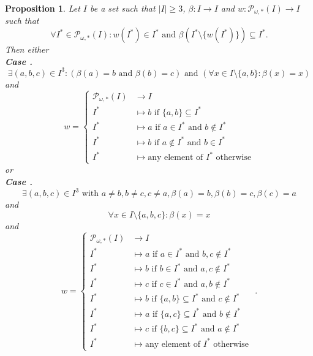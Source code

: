 \documentclass[a4paper,11pt]{article}
\newcommand*\circled[1]{\tikz[baseline=(char.base)]{
            \node[shape=circle,draw,inner sep=2pt] (char) {#1};}}
\theoremstyle{plain}
\newtheorem{proposition}{Proposition}[section]
\theoremstyle{definition}
\theoremstyle{remark}
\begin{document}
\begin{proposition}
\label{propBetaAllP*I}
Let $I$ be a set such that $|I| \geq 3$, $\beta : I \to I$ and $w : \mathcal{P}_{\omega,*}(I) \to I$ such that 
\[ \forall I^* \in \mathcal{P}_{\omega,*}(I) : w(I^*) \in I^* \text{ and } \beta(I^* \setminus \{w(I^*)\}) \subseteq I^*. \] 
Then either \\
\textbf{Case \circled{1}.}
\[ \exists (a,b,c) \in I^3 : (\beta(a)=b \text{ and } \beta(b)=c) \text{ and } (\forall x \in I \setminus \{a,b\} : \beta(x) = x) \]
and
\[ w = \begin{cases} \mathcal{P}_{\omega,*}(I) &\to I \\ I^* &\mapsto b \text{ if } \{a,b\} \subseteq I^* \\ I^* &\mapsto a \text{ if } a \in I^* \text{ and } b \notin I^* \\ I^* &\mapsto b \text{ if } a \notin I^* \text{ and } b \in I^* \\ I^* &\mapsto \text{any element of } I^* \text{ otherwise} \end{cases} \]
or \\
\textbf{Case \circled{2}.} 
\[ \exists (a,b,c) \in I^3 \text{ with } a \neq b, b \neq c, c \neq a, \beta(a)=b, \beta(b)=c, \beta(c)=a \]
and
\[ \forall x \in I \setminus \{a,b,c\} : \beta(x) = x \]
and
\[ w = \begin{cases} \mathcal{P}_{\omega,*}(I) &\to I \\ I^* &\mapsto a \text{ if } a \in I^* \text{ and } b,c \notin I^* \\ I^* &\mapsto b \text{ if } b \in I^* \text{ and } a,c \notin I^* \\ I^* &\mapsto c \text{ if } c \in I^* \text{ and } a,b \notin I^* \\ I^* &\mapsto b \text{ if } \{a,b\} \subseteq I^* \text{ and } c \notin I^* \\ I^* &\mapsto a \text{ if } \{a,c\} \subseteq I^* \text{ and } b \notin I^* \\ I^* &\mapsto c \text{ if } \{b,c\} \subseteq I^* \text{ and } a \notin I^* \\ I^* &\mapsto  \text{any element of } I^* \text{ otherwise }
\end{cases}. \]
\end{proposition}
\end{document}
